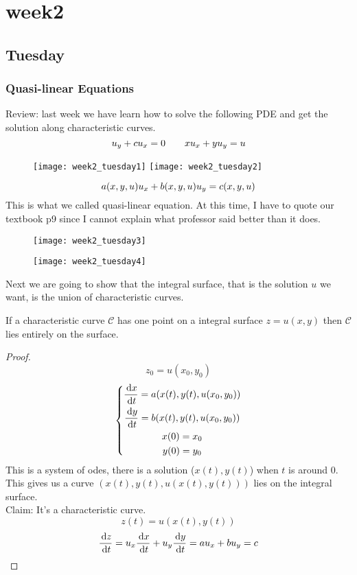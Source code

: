 \chapter{week2}

\section{Tuesday}
\subsection{Quasi-linear Equations}
Review: last week we have learn how to solve the following PDE and get the solution along characteristic curves.
\[u_y+cu_x=0\qquad xu_x+yu_y=u
\]
\begin{figure}[H]
\centering
\texttt{[image: week2\_tuesday1]}
\texttt{[image: week2\_tuesday2]}
\end{figure}
\[a(x,y,u)u_x+b(x,y,u)u_y=c(x,y,u)
\]
This is what we called quasi-linear equation. At this time, I have to quote our textbook p9 since I cannot explain what professor said better than it does.
\begin{figure}[H]
\centering
\texttt{[image: week2\_tuesday3]}
\end{figure}
\begin{figure}[H]
\centering
\texttt{[image: week2\_tuesday4]}
\end{figure}
Next we are going to show that the integral surface, that is the solution $u$ we want, is the union of characteristic curves.
\begin{theorem}
If a characteristic curve $\mathscr{C}$ has one point on a integral surface $z=u(x,y)$ then $\mathscr{C}$ lies entirely on the surface.

\end{theorem}
\begin{proof}
\[z_0=u(x_0,y_0)
\]
\[\left\{\begin{gathered}\frac{\,\mathrm{d} x}{\,\mathrm{d} t}=a(x(t),y(t),u(x_0,y_0))\\\frac{\,\mathrm{d} y}{\,\mathrm{d} t}=b(x(t),y(t),u(x_0,y_0))\\x(0)=x_0\\y(0)=y_0\end{gathered}\right.
\]
This is a system of odes, there is a solution ($x(t),y(t)$) when $t$ is around 0.\\
This gives us a curve $(x(t),y(t),u(x(t),y(t)))$ lies on the integral surface.\\
Claim: It's a characteristic curve.
\[z(t)=u(x(t),y(t))
\]
\[\frac{\,\mathrm{d} z}{\,\mathrm{d} t}=u_x\frac{\,\mathrm{d} x}{\,\mathrm{d} t}+u_y\frac{\,\mathrm{d} y}{\,\mathrm{d} t}=au_x+bu_y=c
\]



\end{proof}
